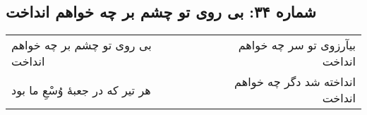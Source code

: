 \begin{center}
\section*{شماره ۳۴: بی روی تو چشم بر چه خواهم انداخت}
\label{sec:034}
\begin{longtable}{l p{0.5cm} r}
بی روی تو چشم بر چه خواهم انداخت
&&
بیآرزوی تو سر چه خواهم انداخت
\\
هر تیر که در جعبهٔ وُسْعِ ما بود
&&
انداخته شد دگر چه خواهم انداخت
\\
\end{longtable}
\end{center}
